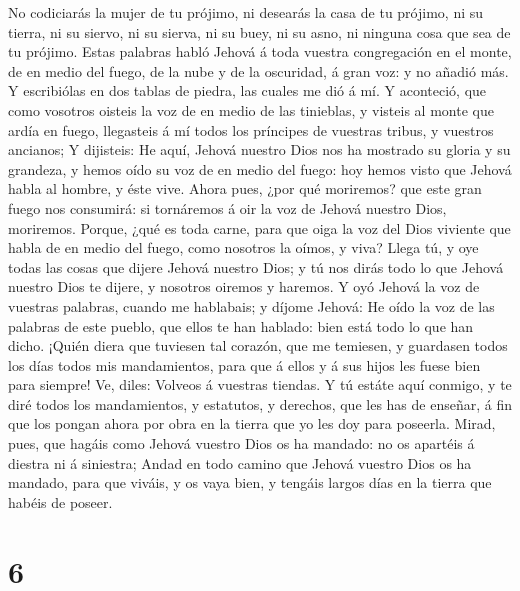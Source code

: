  No codiciarás la mujer de tu prójimo, ni desearás la
casa de tu prójimo, ni su tierra, ni su siervo, ni su sierva, ni su
buey, ni su asno, ni ninguna cosa que sea de tu prójimo. 
Estas palabras habló Jehová á toda vuestra congregación en el monte, de
en medio del fuego, de la nube y de la oscuridad, á gran voz: y no
añadió más. Y escribiólas en dos tablas de piedra, las cuales me dió á
mí.  Y aconteció, que como vosotros oisteis la voz de en
medio de las tinieblas, y visteis al monte que ardía en fuego,
llegasteis á mí todos los príncipes de vuestras tribus, y vuestros
ancianos;  Y dijisteis: He aquí, Jehová nuestro Dios nos
ha mostrado su gloria y su grandeza, y hemos oído su voz de en medio del
fuego: hoy hemos visto que Jehová habla al hombre, y éste vive.
 Ahora pues, ¿por qué moriremos? que este gran fuego nos
consumirá: si tornáremos á oir la voz de Jehová nuestro Dios, moriremos.
 Porque, ¿qué es toda carne, para que oiga la voz del
Dios viviente que habla de en medio del fuego, como nosotros la oímos, y
viva?  Llega tú, y oye todas las cosas que dijere Jehová
nuestro Dios; y tú nos dirás todo lo que Jehová nuestro Dios te dijere,
y nosotros oiremos y haremos.  Y oyó Jehová la voz de
vuestras palabras, cuando me hablabais; y díjome Jehová: He oído la voz
de las palabras de este pueblo, que ellos te han hablado: bien está todo
lo que han dicho.  ¡Quién diera que tuviesen tal corazón,
que me temiesen, y guardasen todos los días todos mis mandamientos, para
que á ellos y á sus hijos les fuese bien para siempre! 
Ve, diles: Volveos á vuestras tiendas.  Y tú estáte aquí
conmigo, y te diré todos los mandamientos, y estatutos, y derechos, que
les has de enseñar, á fin que los pongan ahora por obra en la tierra que
yo les doy para poseerla.  Mirad, pues, que hagáis como
Jehová vuestro Dios os ha mandado: no os apartéis á diestra ni á
siniestra;  Andad en todo camino que Jehová vuestro Dios
os ha mandado, para que viváis, y os vaya bien, y tengáis largos días en
la tierra que habéis de poseer.

\hypertarget{section-5}{%
\section{6}\label{section-5}}

